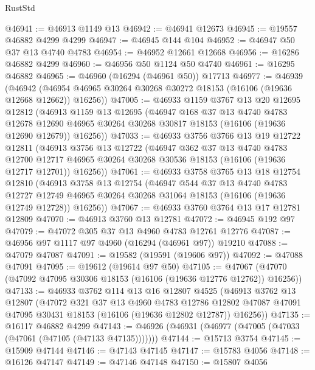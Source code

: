 \begin{lexlean}{RustStd}
\begin{coremodule}
@46941 := @46913 @1149 @13
@46942 := @46941 @12673
@46945 := @19557 @46882 @4299 @4299
@46947 := @46945 @144 @104
@46952 := @46947 @50 @37 @13 @4740 @4783
@46954 := @46952 @12661 @12668
@46956 := @16286 @46882 @4299
@46960 := @46956 @50 @1124 @50 @4740
@46961 := @16295 @46882
@46965 := @46960 (@16294 (@46961 @50)) @17713
@46977 := @46939
    (@46942 (@46954 @46965 @30264 @30268 @30272 @18153 (@16106 (@19636 @12668 @12662)) @16256))
@47005 := @46933
    @1159
    @3767
    @13
    @20
    @12695
    @12812
    (@46913
      @1159
      @13
      @12695
      (@46947
        @168
        @37
        @13
        @4740
        @4783
        @12678
        @12690
        @46965
        @30264
        @30268
        @30817
        @18153
        (@16106 (@19636 @12690 @12679))
        @16256))
@47033 := @46933
    @3756
    @3766
    @13
    @19
    @12722
    @12811
    (@46913
      @3756
      @13
      @12722
      (@46947
        @362
        @37
        @13
        @4740
        @4783
        @12700
        @12717
        @46965
        @30264
        @30268
        @30536
        @18153
        (@16106 (@19636 @12717 @12701))
        @16256))
@47061 := @46933
    @3758
    @3765
    @13
    @18
    @12754
    @12810
    (@46913
      @3758
      @13
      @12754
      (@46947
        @544
        @37
        @13
        @4740
        @4783
        @12727
        @12749
        @46965
        @30264
        @30268
        @31064
        @18153
        (@16106 (@19636 @12749 @12728))
        @16256))
@47067 := @46933 @3760 @3764 @13 @17 @12781 @12809
@47070 := @46913 @3760 @13 @12781
@47072 := @46945 @192 @97
@47079 := @47072 @305 @37 @13 @4960 @4783 @12761 @12776
@47087 := @46956 @97 @1117 @97 @4960 (@16294 (@46961 @97)) @19210
@47088 := @47079 @47087
@47091 := @19582 (@19591 (@19606 @97))
@47092 := @47088 @47091
@47095 := @19612 (@19614 @97 @50)
@47105 := @47067 (@47070 (@47092 @47095 @30306 @18153 (@16106 (@19636 @12776 @12762)) @16256))
@47133 := @46933
    @3762
    @114
    @13
    @16
    @12807
    @4525
    (@46913
      @3762
      @13
      @12807
      (@47072
        @321
        @37
        @13
        @4960
        @4783
        @12786
        @12802
        @47087
        @47091
        @47095
        @30431
        @18153
        (@16106 (@19636 @12802 @12787))
        @16256))
@47135 := @16117 @46882 @4299
@47143 := @46926 (@46931 (@46977 (@47005 (@47033 (@47061 (@47105 (@47133 @47135)))))))
@47144 := @15713 @3754
@47145 := @15909 @47144
@47146 := @47143 @47145
@47147 := @15783 @4056
@47148 := @16126 @47147
@47149 := @47146 @47148
@47150 := @15807 @4056

\end{coremodule}
\end{lexlean}
